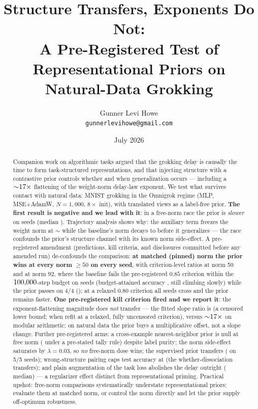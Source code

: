 \documentclass[11pt]{article}
\title{Structure Transfers, Exponents Do Not:\\
\large A Pre-Registered Test of Representational Priors on Natural-Data Grokking}
\author{Gunner Levi Howe\\ \small{\texttt{gunnerlevihowe@gmail.com}}}
\date{July 2026}
\begin{document}
\maketitle

\begin{abstract}
Companion work on algorithmic tasks argued that the grokking delay is causally the time to form
task-structured representations, and that injecting structure with a contrastive prior controls
whether and when generalization occurs --- including a ${\sim}17\times$ flattening of the
weight-norm delay-law exponent. We test what survives contact with natural data: MNIST grokking
in the Omnigrok regime (MLP, MSE+AdamW, $N{=}1{,}000$, $8\times$ init), with translated views as
a label-free prior. \textbf{The first result is negative and we lead with it}: in a free-norm
race the prior is \emph{slower} on \pfAugSlowCount{} seeds (median \pfAugMedSlow). Trajectory
analysis shows why: the auxiliary term freezes the weight norm at ${\sim}$\pfAugNormAtGen{} while
the baseline's norm decays to \pfBaseNormAtGen{} before it generalizes --- the race confounds
the prior's structure channel with its known norm side-effect. A pre-registered amendment
(predictions, kill criteria, and disclosures committed before any amended run) de-confounds the
comparison: \textbf{at matched (pinned) norm the prior wins at every norm $\geq 50$ on every
seed}, with criterion-level ratios \pfRatioCFifty{} at norm 50 and \pfRatioCNinetyTwo{} at norm
92, where the baseline
fails the pre-registered $0.85$ criterion within the $100{,}000$-step budget on
\pfCNTBaseCensored{} seeds (budget-attained accuracy \pfCNTBaseCeilRange, still climbing slowly)
while the prior passes on 4/4 (\pfCNTAugCeilRange); at a relaxed $0.80$ criterion all seeds
cross and the prior remains \pfCNTEightyRatioRange{} faster. \textbf{One pre-registered kill
criterion fired and we report it}: the exponent-flattening magnitude does \emph{not} transfer
--- the fitted slope ratio is \pfSlopeRatio{} (a censored lower bound; \pfSlopeRatioEighty{}
when refit at a relaxed, fully uncensored criterion), versus ${\sim}17\times$ on modular
arithmetic; on natural data the prior buys a multiplicative offset, not a slope change.
Further pre-registered arms: a cross-example nearest-neighbor prior is null at
free norm (\pfNnTally{} under a pre-stated tally rule) despite \pfNnPurityRange{} label purity;
the norm side-effect saturates by $\lambda{=}0.03$, so
\emph{no} free-norm dose wins; the supervised prior transfers (\pfLabelMedSpeed{} on 5/5 seeds);
wrong-structure pairing caps test accuracy at \pfShufCeilRange{} (the whether-dissociation
transfers); and plain augmentation of the task loss abolishes the delay outright
(\pfAugceMedSpeed{} median) --- a regularizer effect distinct from representational priming.
Practical upshot: free-norm comparisons systematically understate representational priors;
evaluate them at matched norm, or control the norm directly and let the prior supply
off-optimum robustness.
\end{abstract}
\end{document}

